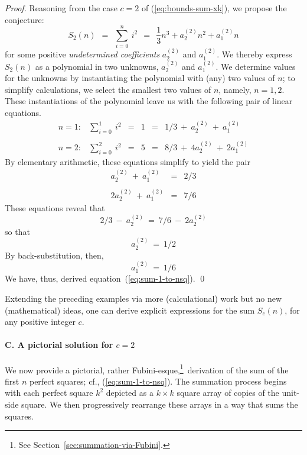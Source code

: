 \begin{proof}
Reasoning from the case $c=2$ of (\ref{eq:bounds-sum-xk}), we propose the conjecture:
\begin{equation}
\label{eq:symbolic-cubic}
S_2(n) \ \ = \ \
\sum_{i=0}^n \ i^2 \ \ = \ \ \frac{1}{3} n^3 + a^{(2)}_2 n^2 + a^{(2)}_1 n
\end{equation}
for some positive {\it undetermined coefficients} $a^{(2)}_2$ and $a^{(2)}_1$.  We thereby express $S_2(n)$ as a polynomial in two unknowns, $a^{(2)}_2$ and $a^{(2)}_1$.  We determine values for the unknowns by instantiating the polynomial with (any) two values of $n$; to simplify calculations, we select the smallest two values of $n$, namely, $n = 1,2$.  These instantiations of the polynomial leave us with the following pair of linear equations.
\[
\begin{array}{cccccl}
n=1: & \sum_{i=0}^1 \ i^2
   & = & 1 & = &
1/3 \ + \ a^{(2)}_2 \ + \ a^{(2)}_1 \\
 & & & & & \\
n=2: & \sum_{i=0}^2 \ i^2
   & = & 5 & = &
8/3 \ + \ 4 a^{(2)}_2 \ + \ 2 a^{(2)}_1
\end{array}
\]
By elementary arithmetic, these equations simplify to yield the pair
\[
\begin{array}{ccc}
a^{(2)}_2 \ + \ a^{(2)}_1   & = & 2/3 \\
 & & \\
2 a^{(2)}_2 \ + \ a^{(2)}_1 & = & 7/6
\end{array}
\]
These equations reveal that
\[ 2/3 \ - \ a^{(2)}_2 \ = \ 7/6 \ - \ 2 a^{(2)}_2 \]
so that 
\[ a^{(2)}_2 \ = \ 1/2 \]
By back-substitution, then,
\[ a^{(2)}_1 \ = \ 1/6 \]
We have, thus, derived equation~(\ref{eq:sum-1-to-nsq}).  \qed
\end{proof}

\medskip

Extending the preceding examples via more (calculational) work but no new (mathematical) ideas, one can derive explicit expressions for the sum $S_c(n)$, for any positive integer $c$.

\medskip 

\paragraph{C. A pictorial solution for $c=2$}

We now provide a pictorial, rather Fubini-esque,\footnote{See Section~\ref{sec:summation-via-Fubini}.}~derivation of the sum of the first $n$ perfect squares; cf., (\ref{eq:sum-1-to-nsq}).  The summation process begins with each perfect square $k^2$ depicted as a $k \times k$ square array of copies of the unit-side square.  We then progressively rearrange these arrays in a way that sums the squares. 

